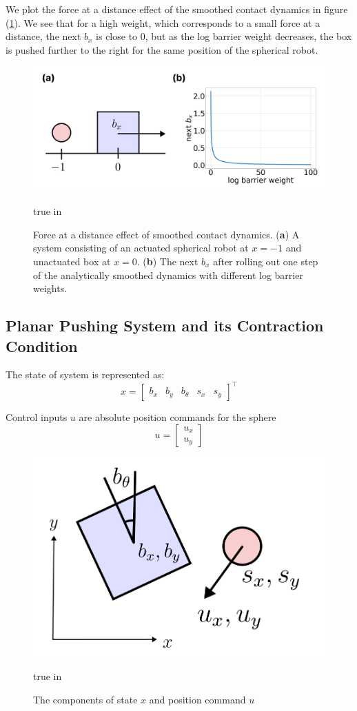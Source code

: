 \documentclass[journal]{IEEEtran}
\begin{document}
We plot the force at a distance effect of the smoothed contact dynamics in figure (\ref{fig:smoothed_contact_dynamics}). We see that for a high weight, which corresponds to a small force at a distance, the next $b_x$ is close to 0, but as the log barrier weight decreases, the box is pushed further to the right for the same position of the spherical robot.

\begin{figure}[h]
	\centering\includegraphics[width = 0.45 \textwidth]
	{figures/smoothed_contact_dynamics.png}
    \caption{Force at a distance effect of smoothed contact dynamics. (\textbf{a}) A system consisting of an actuated spherical robot at $x=-1$ and unactuated box at $x=0$. (\textbf{b}) The next $b_x$ after rolling out one step of the analytically smoothed dynamics with different log barrier weights.}
	\label{fig:smoothed_contact_dynamics}
	 true in
\end{figure}

\subsection{Planar Pushing System and its Contraction Condition}
The state of system is represented as: 
\begin{equation}
    x = \begin{bmatrix}b_x & b_y & b_{\theta}& s_x& s_y\end{bmatrix}^\top
\end{equation}

Control inputs $u$ are absolute position commands for the sphere
\begin{equation}
    u = \begin{bmatrix}u_x\\ u_y \end{bmatrix}
\end{equation}

\begin{figure}[h]
	\centering\includegraphics[width = 0.3 \textwidth]
	{figures/problem_setup.png}
    \caption{The components of state $x$ and position command $u$}
	\label{fig:problem_setup}
	 true in
\end{figure}
\end{document}

